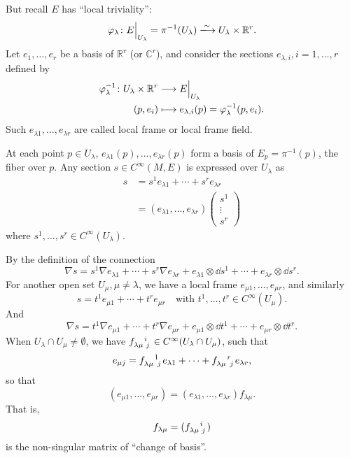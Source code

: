 \documentclass[12pt]{article}
\begin{document}
But recall \(E\) has ``local triviality'': \[
    \vphi_\lambda\colon E\Big|_{U_\lambda}=\pi^{-1}(U_\lambda)
    \xlongrightarrow{\sim} U_\lambda\times \mathbb{R}^r
.\] Let \(e_1,\ldots,e_r\) be a basis of \(\mathbb{R}^r\) (or
\(\mathbb{C}^r\)), and consider the sections \(e_{\lambda,i},i=1,\ldots,
r\) defined by \begin{align*}
    \varphi_\lambda^{-1}\colon U_\lambda\times \mathbb{R}^r
    &\longrightarrow E\Big|_{U_\lambda} \\
    (p,e_i) &\longmapsto e_{\lambda,i}(p)=\varphi_\lambda^{-1}(p,e_i)
.\end{align*}
Such \(e_{\lambda 1},\ldots,e_{\lambda r}\) are called local frame
or local frame field.

At each point \(p\in U_\lambda\),
\(e_{\lambda 1}(p),\ldots,e_{\lambda r}(p)\) form a basis of
\(E_p=\pi^{-1}(p)\), the fiber over \(p\).
Any section \(s \in C^\infty(M,E)\) is expressed over \(U_\lambda\) as
\begin{align*}
    s&=s^1e_{\lambda 1}+\cdots +s^r e_{\lambda r} \\
    &= (e_{\lambda 1},\ldots,e_{\lambda r})\begin{pmatrix}
        s^1 \\ \vdots \\ s^r
    \end{pmatrix}
\end{align*}
where \(s^1,\ldots,s^r\in C^\infty(U_\lambda)\).

By the definition of the connection \[
    \nabla s=s^1\nabla e_{\lambda 1}+\cdots +s^r\nabla e_{\lambda r}
    +e_{\lambda 1}\otimes \dd{s^1}+\cdots +e_{\lambda r}\otimes \dd{s^r}
.\] For another open set \(U_\mu,\mu\neq \lambda\), we have a local frame
\(e_{\mu 1},\ldots,e_{\mu r}\), and similarly \[
    s=t^1 e_{\mu 1}+\cdots +t^r e_{\mu r}\quad
    \text{with }t^1,\ldots,t^r\in C^\infty(U_\mu)
.\] And \[
    \nabla s=t^1\nabla e_{\mu 1}+\cdots +t^r\nabla e_{\mu r}
    +e_{\mu 1}\otimes \dd{t^1}+\cdots +e_{\mu r}\otimes \dd{t^r}
.\] When \(U_\lambda \cap U_\mu\neq \emptyset\), we have \(\tensor{f}
{_\lambda_\mu^i_j}\in C^\infty(U_\lambda \cap U_\mu)\), such that \[
    e_{\mu j}=\tensor{f}{_\lambda_\mu^1_j} e_{\lambda 1}+\cdots +
    \tensor{f}{_\lambda_\mu^r_j}e_{\lambda r}
,\] so that
\begin{equation}\label{eq:1-2:1}
(e_{\mu 1},\ldots,e_{\mu r})=(e_{\lambda 1},\ldots,e_{\lambda r})
f_{\lambda \mu}
.\end{equation}
That is, \[
    f_{\lambda \mu}=(\tensor{f}{_\lambda_\mu^i_j})
\] is the non-singular matrix of ``change of basis''.
\end{document}

